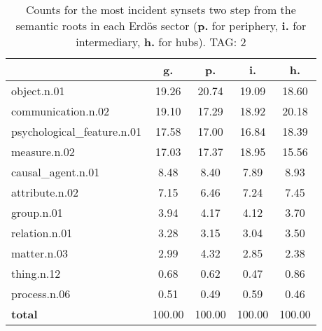 \begin{table}[h!]
\begin{center}
\begin{tabular}{| l | c | c | c | c |}\hline
 & g. & p. & i. & h. \\\hline
object.n.01 & 19.26  & 20.74  & 19.09  & 18.60 \\\hline
communication.n.02 & 19.10  & 17.29  & 18.92  & 20.18 \\\hline
psychological\_feature.n.01 & 17.58  & 17.00  & 16.84  & 18.39 \\\hline
measure.n.02 & 17.03  & 17.37  & 18.95  & 15.56 \\\hline
causal\_agent.n.01 & 8.48  & 8.40  & 7.89  & 8.93 \\\hline
attribute.n.02 & 7.15  & 6.46  & 7.24  & 7.45 \\\hline
group.n.01 & 3.94  & 4.17  & 4.12  & 3.70 \\\hline
relation.n.01 & 3.28  & 3.15  & 3.04  & 3.50 \\\hline
matter.n.03 & 2.99  & 4.32  & 2.85  & 2.38 \\\hline
thing.n.12 & 0.68  & 0.62  & 0.47  & 0.86 \\\hline
process.n.06 & 0.51  & 0.49  & 0.59  & 0.46 \\\hline
{{\bf total}} & 100.00  & 100.00  & 100.00  & 100.00 \\\hline
\end{tabular}
\caption{Counts for the most incident synsets two step from the semantic roots in each Erd\"os sector ({\bf p.} for periphery, {\bf i.} for intermediary, {\bf h.} for hubs). TAG: 2}
\end{center}
\end{table}